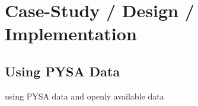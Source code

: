 \chapter{Case-Study / Design / Implementation}
\label{cha:implementation}
\section{Using PYSA Data}


using PYSA data and openly available data